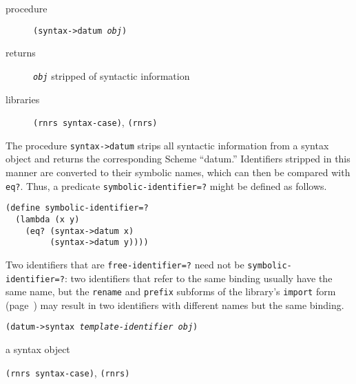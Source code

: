 \begin{description}

\label{syntax_s44}\item[procedure] \texttt{(syntax-\textgreater{}datum \textit{obj})}



\item[returns] \texttt{\textit{obj}} stripped of syntactic information


\item[libraries] \texttt{(rnrs syntax-case)}, \texttt{(rnrs)}
\end{description}


The procedure \texttt{syntax-\textgreater{}datum}
strips all syntactic information from a syntax
object and returns the corresponding Scheme ``datum.''
Identifiers stripped in this manner are converted to their symbolic
names, which can then be compared with \texttt{eq?}.
Thus, a predicate \texttt{symbolic-identifier=?} might be defined as follows.


\begin{alltt}
(define symbolic-identifier=?
  (lambda (x y)
    (eq? (syntax-\textgreater{}datum x)
         (syntax-\textgreater{}datum y))))
\end{alltt}


Two identifiers that are \texttt{free-identifier=?} need not be
\texttt{symbolic-identifier=?}: two identifiers that refer to the
same binding usually have the same name, but the \texttt{rename} and
\texttt{prefix} subforms of the library's \texttt{import} form
(page \pageref{libraries_desc_import}) may
result in two identifiers with different names but the same binding.

\begin{description}

\label{syntax_s45}\item[procedure] \texttt{(datum-\textgreater{}syntax \textit{template-identifier} \textit{obj})}



\item[returns] a syntax object


\item[libraries] \texttt{(rnrs syntax-case)}, \texttt{(rnrs)}
\end{description}

